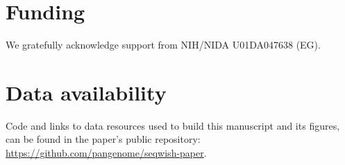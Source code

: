 \documentclass{bioinfo}
\begin{document}
    \section*{Funding}

    We gratefully acknowledge support from NIH/NIDA U01DA047638 (EG).

    \section*{Data availability}

    Code and links to data resources used to build this manuscript and its figures, can be found in the paper's public repository: \url{https://github.com/pangenome/seqwish-paper}.

    

    
\end{document}
